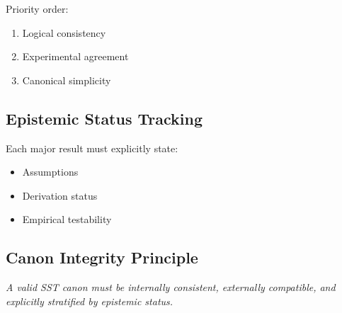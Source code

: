         Priority order:
        
        \begin{enumerate}
            \item Logical consistency
            \item Experimental agreement
            \item Canonical simplicity
        \end{enumerate}
    
    \subsection{Epistemic Status Tracking}
        
        Each major result must explicitly state:
        
        \begin{itemize}
            \item Assumptions
            \item Derivation status
            \item Empirical testability
        \end{itemize}
    
    \subsection{Canon Integrity Principle}
        
        \begin{center}
            \textit{A valid SST canon must be internally consistent, externally compatible, and explicitly stratified by epistemic status.}
        \end{center}